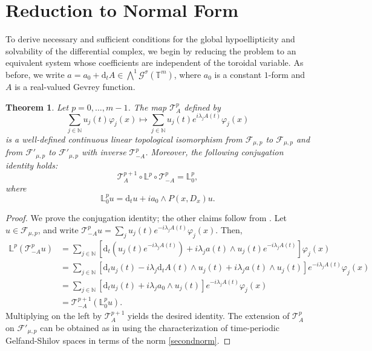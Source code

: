 \documentclass[12pt,reqno]{amsart}
\newtheorem{theorem}{Theorem}[section]
\theoremstyle{definition}
\numberwithin{equation}{section}
\begin{document}
\section{Reduction to Normal Form}\label{sec-normalformreduction}


To derive necessary and sufficient conditions for the global hypoellipticity and solvability of the differential complex, we begin by reducing the problem to an equivalent system whose coefficients are independent of the toroidal variable. As before, we write $a = a_0 + \mathrm{d}_t A \in \textstyle\bigwedge^1 \mathcal{G}^\sigma(\mathbb{T}^m)$, where $a_0$ is a constant $1$-form and $A$ is a real-valued Gevrey function.

\begin{theorem}\label{iso_A}
	Let $p = 0, \ldots, m - 1$. The map $\mathscr{T}_A^p$ defined by
	\[
	\sum_{j \in \mathbb{N}} u_j(t)\varphi_j(x) \mapsto \sum_{j \in \mathbb{N}} u_j(t)e^{i\lambda_j A(t)}\varphi_j(x)
	\]
	is a well-defined continuous linear topological isomorphism from $\mathscr{F}_{\mu,p}$ to $\mathscr{F}_{\mu,p}$ and from $\mathscr{F}'_{\mu,p}$ to $\mathscr{F}'_{\mu,p}$ with inverse $\mathscr{T}_{-A}^p$. Moreover, the following conjugation identity holds:
	\[
	\mathscr{T}_A^{p+1} \circ \mathbb{L}^p \circ \mathscr{T}_{-A}^p = \mathbb{L}_0^p,
	\]
	where
	\[
	\mathbb{L}_0^p u = \mathrm{d}_t u + i a_0 \wedge P(x,D_x) u.
	\]
\end{theorem}

\begin{proof}
	We prove the conjugation identity; the other claims follow from \cite[Proposition 3.2]{AviCapKir26}. Let $u \in \mathscr{F}_{\mu,p}$, and write $\mathscr{T}_{-A}^p u = \sum_{j} u_j(t)e^{-i\lambda_j A(t)}\varphi_j(x)$. Then,
	\begin{align*}
		\mathbb{L}^p \left( \mathscr{T}_{-A}^p u \right) 
		&= \sum_{j \in \mathbb{N}} \left[ \mathrm{d}_t \left( u_j(t)e^{-i\lambda_j A(t)} \right) + i \lambda_j a(t) \wedge u_j(t)e^{-i\lambda_j A(t)} \right] \varphi_j(x) \\
		&= \sum_{j \in \mathbb{N}} \left[ \mathrm{d}_t u_j(t) - i \lambda_j \mathrm{d}_t A(t) \wedge u_j(t) + i \lambda_j a(t) \wedge u_j(t) \right] e^{-i\lambda_j A(t)} \varphi_j(x) \\
		&= \sum_{j \in \mathbb{N}} \left[ \mathrm{d}_t u_j(t) + i \lambda_j a_0 \wedge u_j(t) \right] e^{-i\lambda_j A(t)} \varphi_j(x) \\
		&= \mathscr{T}_{-A}^{p+1} \left( \mathbb{L}_0^p u \right).
	\end{align*}
	Multiplying on the left by $\mathscr{T}_A^{p+1}$ yields the desired identity. The extension of $\mathscr{T}_A^{p}$ on $\mathscr{F}'_{\mu,p}$ can be obtained as in \cite[Proposition 3.1]{AviCapKir26} using the characterization of time-periodic Gelfand-Shilov spaces in terms of the norm \eqref{secondnorm}.
\end{proof}
\end{document}
